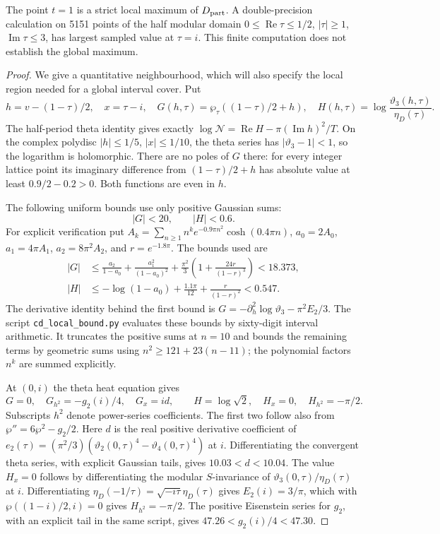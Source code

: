 \begin{proposition}[C.2.2; Proved]\label{st:C.2.2}
The point \(t=1\) is a strict local maximum of \(D_{\rm part}\).
A double-precision calculation on 5151 points of the half modular domain
\(0\leq\operatorname{Re}\tau\leq1/2\), \(|\tau|\geq1\),
\(\operatorname{Im}\tau\leq3\), has largest sampled value at \(\tau=i\).
This finite computation does not establish the global maximum.
\end{proposition}
\begin{proof}
We give a quantitative neighbourhood, which will also specify the local
region needed for a global interval cover. Put
\[
 h=v-(1-\tau)/2,\quad x=\tau-i,\quad
 G(h,\tau)=\wp_\tau((1-\tau)/2+h),\quad
 H(h,\tau)=\log\frac{\vartheta_3(h,\tau)}{\eta_D(\tau)}.
\]
The half-period theta identity gives exactly
$\log\mathcal N=\operatorname{Re}H-\pi(\operatorname{Im}h)^2/T$.
On the complex polydisc $|h|\leq1/5$, $|x|\leq1/10$, the theta series
has $|\vartheta_3-1|<1$, so the logarithm is holomorphic. There are no
poles of $G$ there: for every integer lattice point its imaginary
difference from $(1-\tau)/2+h$ has absolute value at least
$0.9/2-0.2>0$. Both functions are even in $h$.

The following uniform bounds use only positive Gaussian sums:
\[
 |G|<20,\qquad |H|<0.6.
\]
For explicit verification put
$A_k=\sum_{n\geq1}n^k e^{-0.9\pi n^2}\cosh(0.4\pi n)$,
$a_0=2A_0$, $a_1=4\pi A_1$, $a_2=8\pi^2A_2$, and $r=e^{-1.8\pi}$.
The bounds used are
\[
 \begin{aligned}
 |G|&\leq\frac{a_2}{1-a_0}+\frac{a_1^2}{(1-a_0)^2}
 +\frac{\pi^2}3\left(1+\frac{24r}{(1-r)^3}\right)<18.373,\\
 |H|&\leq-\log(1-a_0)+\frac{1.1\pi}{12}+
 \frac r{(1-r)^2}<0.547.
 \end{aligned}
\]
The derivative identity behind the first bound is
$G=-\partial_h^2\log\vartheta_3-\pi^2E_2/3$.
The script \texttt{cd\_local\_bound.py} evaluates these bounds by sixty-digit
interval arithmetic. It truncates the positive sums at $n=10$ and bounds
the remaining terms by geometric sums using
$n^2\geq121+23(n-11)$; the polynomial factors $n^k$ are summed explicitly.

At $(0,i)$ the theta heat equation gives
\[
 G=0,\quad G_{h^2}=-g_2(i)/4,\quad G_x=id,
 \qquad H=\log\sqrt2,\quad H_x=0,\quad H_{h^2}=-\pi/2.
\]
Subscripts $h^2$ denote power-series coefficients. The first two follow
also from $\wp''=6\wp^2-g_2/2$. Here $d$ is the real positive derivative coefficient of
$e_2(\tau)=(\pi^2/3)(\vartheta_2(0,\tau)^4-
\vartheta_4(0,\tau)^4)$ at $i$. Differentiating the convergent theta
series, with explicit Gaussian tails, gives $10.03<d<10.04$.
The value $H_x=0$ follows by differentiating the modular $S$-invariance
of $\vartheta_3(0,\tau)/\eta_D(\tau)$ at $i$. Differentiating
$\eta_D(-1/\tau)=\sqrt{-i\tau}\eta_D(\tau)$ gives $E_2(i)=3/\pi$,
which with $\wp((1-i)/2,i)=0$ gives $H_{h^2}=-\pi/2$.
The positive Eisenstein series for $g_2$, with an explicit tail in the
same script, gives $47.26<g_2(i)/4<47.30$.


\end{proof}
